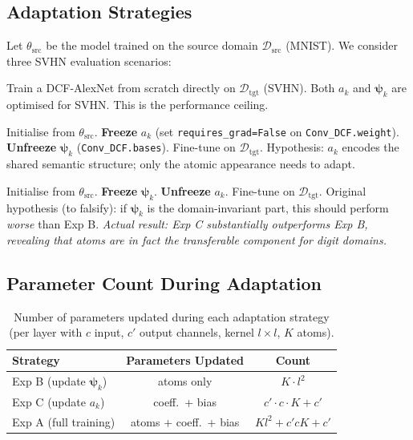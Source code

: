 \documentclass[11pt,letterpaper]{article}
\newcommand{\psivec}{\boldsymbol{\psi}}
\newcommand{\mD}{\mathcal{D}}
\begin{document}
\subsection{Adaptation Strategies}

Let $\theta_\text{src}$ be the model trained on the source domain
$\mD_\text{src}$ (MNIST).  We consider three SVHN evaluation scenarios:

\begin{description}[leftmargin=0pt]
  \item[Exp A (Upper Bound):]
    Train a DCF-AlexNet from scratch directly on $\mD_\text{tgt}$ (SVHN).
    Both $a_k$ and $\psivec_k$ are optimised for SVHN.
    This is the performance ceiling.

  \item[Exp B (Shared $a_k$, Domain-Specific $\psivec_k$):]
    Initialise from $\theta_\text{src}$.
    \textbf{Freeze} $a_k$ (set \texttt{requires\_grad=False} on
    \texttt{Conv\_DCF.weight}).
    \textbf{Unfreeze} $\psivec_k$ (\texttt{Conv\_DCF.bases}).
    Fine-tune on $\mD_\text{tgt}$.
    Hypothesis: $a_k$ encodes the shared semantic structure; only the atomic
    appearance needs to adapt.

  \item[Exp C (Shared $\psivec_k$, Domain-Specific $a_k$) — Ablation:]
    Initialise from $\theta_\text{src}$.
    \textbf{Freeze} $\psivec_k$.
    \textbf{Unfreeze} $a_k$.
    Fine-tune on $\mD_\text{tgt}$.
    Original hypothesis (to falsify): if $\psivec_k$ is the domain-invariant
    part, this should perform \emph{worse} than Exp B.
    \emph{Actual result: Exp C substantially outperforms Exp B, revealing
    that atoms are in fact the transferable component for digit domains.}
\end{description}

\subsection{Parameter Count During Adaptation}

\begin{table}[h]
\centering
\caption{Number of parameters updated during each adaptation strategy
         (per layer with $c$ input, $c'$ output channels, kernel $l{\times}l$, $K$ atoms).}
\label{tab:adapt_params}
\begin{tabular}{lcc}
\toprule
Strategy & Parameters Updated & Count \\
\midrule
Exp B (update $\psivec_k$) & atoms only & $K \cdot l^2$ \\
Exp C (update $a_k$)       & coeff.\ + bias & $c' \cdot c \cdot K + c'$ \\
Exp A (full training)       & atoms + coeff.\ + bias & $K l^2 + c'cK + c'$ \\
\bottomrule
\end{tabular}
\end{table}
\end{document}

